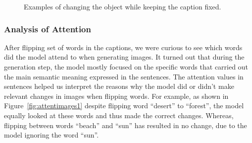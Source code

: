 \documentclass{article} %
\begin{document}
\begin{figure}[!h]
\captionsetup[subfigure]{labelformat=empty}
\begin{center}
\quad
%
\quad
%
\quad
%
\quad
%
\end{center}
\caption{Examples of changing the object while keeping the caption fixed.}
\label{fig:genimages3}
\vspace{-0.3cm}
\end{figure}

\subsubsection{Analysis of Attention}

After flipping set of words in the captions, we were curious to see which words did the model attend to when generating images. It turned out that during the generation step, the model mostly focused on the specific words that carried out the main semantic meaning expressed in the sentences. The attention values in sentences helped us interpret the reasons why the model did or didn't make relevant changes in images when flipping words. For example, as shown in Figure~\ref{fig:attentimages1} despite flipping word ``desert'' to ``forest'', the model equally looked at these words and thus made the correct changes. Whereas, flipping between words ``beach'' and ``sun'' has resulted in no change, due to the model ignoring the word ``sun''.
\end{document}
